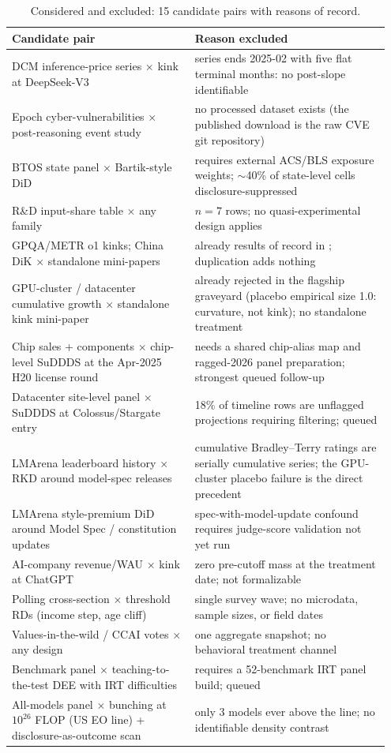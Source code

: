 \documentclass[11pt]{article}
\begin{document}
\begin{table}[t]
\centering
\footnotesize
\setlength{\tabcolsep}{4pt}
\caption{Considered and excluded: 15 candidate pairs with reasons of record.}
\label{tab:excluded}
\begin{tabular}{@{}p{0.46\linewidth}p{0.49\linewidth}@{}}
\toprule
Candidate pair & Reason excluded \\
\midrule
DCM inference-price series $\times$ kink at DeepSeek-V3 & series ends
2025-02 with five flat terminal months: no post-slope identifiable \\
Epoch cyber-vulnerabilities $\times$ post-reasoning event study & no
processed dataset exists (the published download is the raw CVE git
repository) \\
BTOS state panel $\times$ Bartik-style DiD & requires external ACS/BLS
exposure weights; $\sim$40\% of state-level cells disclosure-suppressed \\
R\&D input-share table $\times$ any family & $n=7$ rows; no
quasi-experimental design applies \\
GPQA/METR o1 kinks; China DiK $\times$ standalone mini-papers & already
results of record in \cite{flagship}; duplication adds nothing \\
GPU-cluster / datacenter cumulative growth $\times$ standalone kink
mini-paper & already rejected in the flagship graveyard (placebo empirical
size 1.0: curvature, not kink); no standalone treatment \\
Chip sales + components $\times$ chip-level SuDDDS at the Apr-2025 H20
license round & needs a shared chip-alias map and ragged-2026 panel
preparation; strongest queued follow-up \\
Datacenter site-level panel $\times$ SuDDDS at Colossus/Stargate entry &
18\% of timeline rows are unflagged projections requiring filtering; queued \\
LMArena leaderboard history $\times$ RKD around model-spec releases &
cumulative Bradley--Terry ratings are serially cumulative series; the
GPU-cluster placebo failure is the direct precedent \\
LMArena style-premium DiD around Model Spec / constitution updates &
spec-with-model-update confound requires judge-score validation not yet
run \\
AI-company revenue/WAU $\times$ kink at ChatGPT & zero pre-cutoff mass at
the treatment date; not formalizable \\
Polling cross-section $\times$ threshold RDs (income step, age cliff) &
single survey wave; no microdata, sample sizes, or field dates \\
Values-in-the-wild / CCAI votes $\times$ any design & one aggregate
snapshot; no behavioral treatment channel \\
Benchmark panel $\times$ teaching-to-the-test DEE with IRT difficulties &
requires a 52-benchmark IRT panel build; queued \\
All-models panel $\times$ bunching at $10^{26}$ FLOP (US EO line) +
disclosure-as-outcome scan & only 3 models ever above the line; no
identifiable density contrast \\
\bottomrule
\end{tabular}
\end{table}
\end{document}
